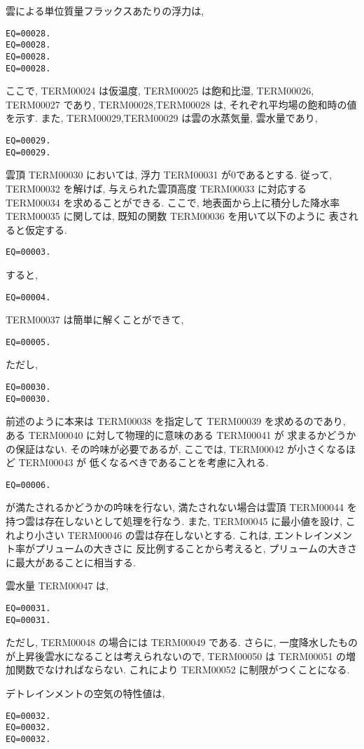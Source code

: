 雲による単位質量フラックスあたりの浮力は,
\begin{verbatim}
EQ=00028.
EQ=00028.
EQ=00028.
EQ=00028.
\end{verbatim}
ここで, TERM00024 は仮温度, TERM00025 は飽和比湿,
TERM00026,
TERM00027 であり,
TERM00028,TERM00028 は, それぞれ平均場の飽和時の値を示す.
また, TERM00029,TERM00029 は雲の水蒸気量, 雲水量であり,
\begin{verbatim}
EQ=00029.
EQ=00029.
\end{verbatim}
雲頂 TERM00030 においては, 浮力 TERM00031 が0であるとする.
従って, TERM00032 を解けば, 与えられた雲頂高度 TERM00033 に対応する
TERM00034 を求めることができる.
ここで, 地表面から上に積分した降水率 TERM00035 に関しては, 
既知の関数 TERM00036 を用いて以下のように
表されると仮定する. 
\begin{verbatim}
EQ=00003.
\end{verbatim}
すると, 
\begin{verbatim}
EQ=00004.
\end{verbatim}

TERM00037 は簡単に解くことができて,
\begin{verbatim}
EQ=00005.
\end{verbatim}
ただし, 
\begin{verbatim}
EQ=00030.
EQ=00030.
\end{verbatim}

前述のように本来は TERM00038 を指定して TERM00039 を求めるのであり,
ある TERM00040 に対して物理的に意味のある TERM00041 が
求まるかどうかの保証はない. 
その吟味が必要であるが, ここでは,
TERM00042 が小さくなるほど TERM00043 が
低くなるべきであることを考慮に入れる.
\begin{verbatim}
EQ=00006.
\end{verbatim}
が満たされるかどうかの吟味を行ない,
満たされない場合は雲頂 TERM00044 を持つ雲は存在しないとして処理を行なう.
また, TERM00045 に最小値を設け, 
これより小さい TERM00046 の雲は存在しないとする.
これは, エントレインメント率がプリュームの大きさに
反比例することから考えると, 
プリュームの大きさに最大があることに相当する.

雲水量 TERM00047 は,
\begin{verbatim}
EQ=00031.
EQ=00031.
\end{verbatim}
ただし, TERM00048 の場合には TERM00049 である.
さらに, 一度降水したものが上昇後雲水になることは考えられないので,
TERM00050 は TERM00051 の増加関数でなければならない.
これにより TERM00052 に制限がつくことになる.

デトレインメントの空気の特性値は,
\begin{verbatim}
EQ=00032.
EQ=00032.
EQ=00032.
\end{verbatim}

